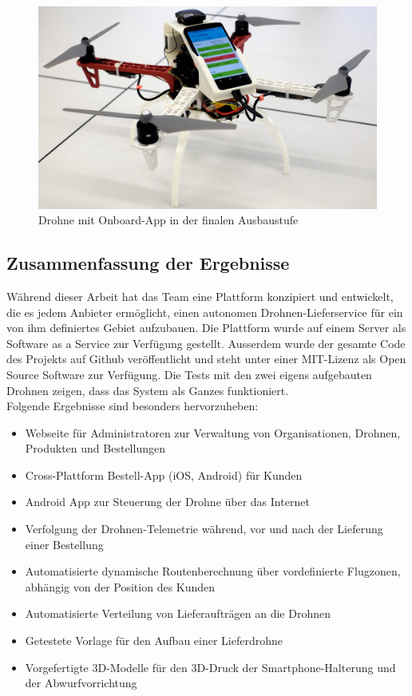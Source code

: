 \begin{figure}[H]
	\centering
	\includegraphics[width=1.0\textwidth] {images/drone.jpg}
	\caption{Drohne mit Onboard-App in der finalen Ausbaustufe}
\end{figure}



\subsection{Zusammenfassung der Ergebnisse}

Während dieser Arbeit hat das Team eine Plattform konzipiert und entwickelt, die es jedem Anbieter ermöglicht, einen autonomen Drohnen-Lieferservice für ein von ihm definiertes Gebiet aufzubauen. Die Plattform wurde auf einem Server als Software as a Service zur Verfügung gestellt. Ausserdem wurde der gesamte Code des Projekts auf Github veröffentlicht und steht unter einer \Gls{MIT-Lizenz} als Open Source Software zur Verfügung. Die Tests mit den zwei eigens aufgebauten Drohnen zeigen, dass das System als Ganzes funktioniert. \\

Folgende Ergebnisse sind besonders hervorzuheben:

\begin{itemize}
	\item Webseite für Administratoren zur Verwaltung von Organisationen, Drohnen, Produkten und Bestellungen
	\item Cross-Plattform Bestell-App (iOS, Android) für Kunden
	\item Android App zur Steuerung der Drohne über das Internet
	\item Verfolgung der Drohnen-Telemetrie während, vor und nach der Lieferung einer Bestellung
	\item Automatisierte dynamische Routenberechnung über vordefinierte Flugzonen, abhängig von der Position des Kunden
	\item Automatisierte Verteilung von Lieferaufträgen an die Drohnen
	\item Getestete Vorlage für den Aufbau einer Lieferdrohne
	\item Vorgefertigte 3D-Modelle für den 3D-Druck der Smartphone-Halterung und der Abwurfvorrichtung
\end{itemize}


